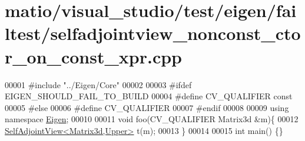 \hypertarget{matio_2visual__studio_2test_2eigen_2failtest_2selfadjointview__nonconst__ctor__on__const__xpr_8cpp_source}{}\section{matio/visual\+\_\+studio/test/eigen/failtest/selfadjointview\+\_\+nonconst\+\_\+ctor\+\_\+on\+\_\+const\+\_\+xpr.cpp}
\label{matio_2visual__studio_2test_2eigen_2failtest_2selfadjointview__nonconst__ctor__on__const__xpr_8cpp_source}

\begin{DoxyCode}
00001 \textcolor{preprocessor}{#include "../Eigen/Core"}
00002 
00003 \textcolor{preprocessor}{#ifdef EIGEN\_SHOULD\_FAIL\_TO\_BUILD}
00004 \textcolor{preprocessor}{#define CV\_QUALIFIER const}
00005 \textcolor{preprocessor}{#else}
00006 \textcolor{preprocessor}{#define CV\_QUALIFIER}
00007 \textcolor{preprocessor}{#endif}
00008 
00009 \textcolor{keyword}{using namespace }\hyperlink{namespace_eigen}{Eigen};
00010 
00011 \textcolor{keywordtype}{void} foo(CV\_QUALIFIER Matrix3d &m)\{
00012     \hyperlink{group___core___module_class_eigen_1_1_self_adjoint_view}{SelfAdjointView<Matrix3d,Upper>} t(m);
00013 \}
00014 
00015 \textcolor{keywordtype}{int} main() \{\}
\end{DoxyCode}
